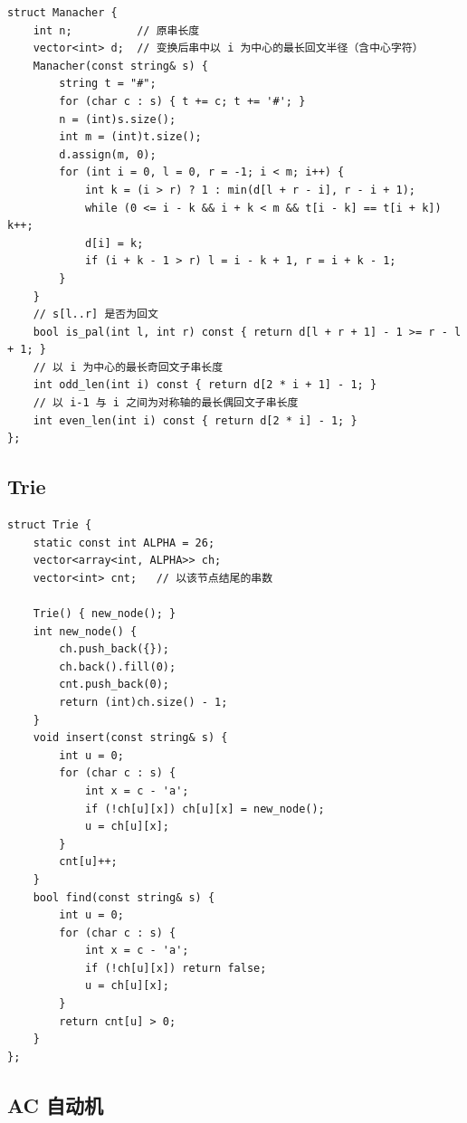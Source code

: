 \begin{lstlisting}
struct Manacher {
    int n;          // 原串长度
    vector<int> d;  // 变换后串中以 i 为中心的最长回文半径（含中心字符）
    Manacher(const string& s) {
        string t = "#";
        for (char c : s) { t += c; t += '#'; }
        n = (int)s.size();
        int m = (int)t.size();
        d.assign(m, 0);
        for (int i = 0, l = 0, r = -1; i < m; i++) {
            int k = (i > r) ? 1 : min(d[l + r - i], r - i + 1);
            while (0 <= i - k && i + k < m && t[i - k] == t[i + k]) k++;
            d[i] = k;
            if (i + k - 1 > r) l = i - k + 1, r = i + k - 1;
        }
    }
    // s[l..r] 是否为回文
    bool is_pal(int l, int r) const { return d[l + r + 1] - 1 >= r - l + 1; }
    // 以 i 为中心的最长奇回文子串长度
    int odd_len(int i) const { return d[2 * i + 1] - 1; }
    // 以 i-1 与 i 之间为对称轴的最长偶回文子串长度
    int even_len(int i) const { return d[2 * i] - 1; }
};
\end{lstlisting}

\subsection{Trie}

\begin{lstlisting}
struct Trie {
    static const int ALPHA = 26;
    vector<array<int, ALPHA>> ch;
    vector<int> cnt;   // 以该节点结尾的串数

    Trie() { new_node(); }
    int new_node() {
        ch.push_back({});
        ch.back().fill(0);
        cnt.push_back(0);
        return (int)ch.size() - 1;
    }
    void insert(const string& s) {
        int u = 0;
        for (char c : s) {
            int x = c - 'a';
            if (!ch[u][x]) ch[u][x] = new_node();
            u = ch[u][x];
        }
        cnt[u]++;
    }
    bool find(const string& s) {
        int u = 0;
        for (char c : s) {
            int x = c - 'a';
            if (!ch[u][x]) return false;
            u = ch[u][x];
        }
        return cnt[u] > 0;
    }
};
\end{lstlisting}

\subsection{AC 自动机}

